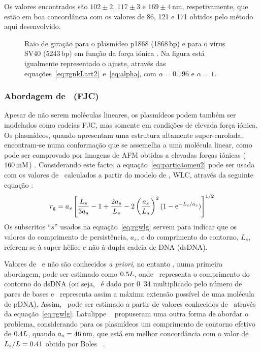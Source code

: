 %
Os valores encontrados são $102\pm2$, $117\pm3$ e $169\pm4$\,nm, respetivamente, que estão em boa concordância com os valores de 86, 121 e \unit{171}{\nano\meter} obtidos pelo método aqui desenvolvido. 
\begin{figure}
	\centering
	\setlength\figureheight{6cm} 
	\setlength\figurewidth{6cm}
	
	\caption[Raio de giração (p1868 e SV40) em função da força iónica]{Raio de giração para o plasmídeo p1868 (1868\,bp) e para o vírus SV40 (5243\,bp) em função da força iónica \cite{hammermann}. Na figura está igualmente representado o ajuste, através das equações~\ref{eq:rgnkLart2}~e~\ref{eq:alpha}, com $\alpha=0.196$ e $\alpha=1$.}
	\label{fig:aart2}
\end{figure}

\subsubsection{Abordagem de \fjc\ (FJC)}
%
%
%
%
Apesar de não serem moléculas lineares, os plasmídeos podem também ser modelados como cadeias FJC, mas somente em condições de elevada força iónica. Os plasmídeos, quando apresentam uma estrutura altamente super-enrolada, encontram-se numa conformação que se assemelha a uma molécula linear, como pode ser comprovado por imagens de AFM obtidas a elevadas forças iónicas ($160\mathrm{\,mM}$) \cite{lyubchenko}.
Considerando este facto, a equação~\ref{eq:partiçãomeu2} pode ser usada com os valores de \raiogiracao\ calculados a partir do modelo de \wlc, WLC, através da seguinte equação \cite{latu07,latusalt,latu09}:
%
\begin{equation}
\label{eq:rgwlg}
r_{\mathrm{g}}=a_{s}\left[\frac{L_{s}}{3a_{s}}-1+\frac{2a_{s}}{L_{s}}-2\left(\frac{a_{s}}{L_{s}}\right)^{2}(1-\mathrm{e}^{-L_{s}/a_{s}})\right]^{1/2}
\end{equation}
Os subscritos ``$s$'' usados na equação~\ref{eq:rgwlg} servem para indicar que os valores do comprimento de persistência, $a_{s}$, e do comprimento do contorno, $L_{s}$, referem-se à super-hélice e não à dupla cadeia de DNA (dsDNA).
% 

Valores de \contornosuper\ e \persissuper não são conhecidos \emph{a priori}, no entanto \contornosuper, numa primeira abordagem, pode ser estimado como $0.5L$, onde \contorno\ representa o comprimento do contorno do dsDNA (ou seja, \contorno\ é dado por \unit{0.34}{\nano\meter} multiplicado pelo número de pares de bases e \contornosuper\ representa assim a máxima extensão possível de uma molécula de pDNA).
Assim, \persissuper\ pode ser estimado a partir de valores conhecidos de \raiogiracao\ através da equação~\ref{eq:rgwlg}. Latulippe \et\ \cite{latusls} propuseram uma outra forma de abordar o problema, considerando para os plasmídeos um comprimento de contorno efetivo de $0.4L$, quando $a_{s}=46\,\mathrm{nm}$, que está em melhor concordância com o valor de $L_{s}/L=0.41$ obtido por Boles \et\ \cite{boles}.


